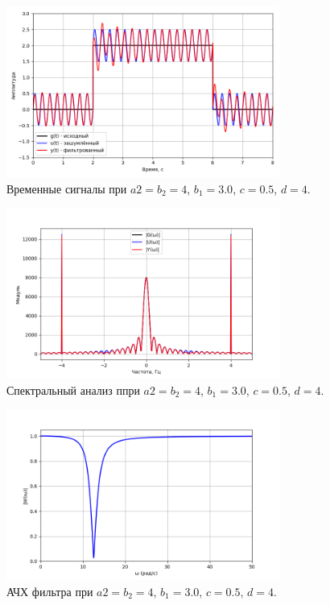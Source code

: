 \documentclass[a4paper]{article}
\begin{document}
\begin{figure}[H]
  \centering
  \includegraphics[width=0.8\textwidth]{src/task_1_2/1. time_157_3_0.5.png}
  \caption{Временные сигналы при $a2 = b_2 = 4$, $b_1=3.0$, $c=0.5$, $d=4$.}
\end{figure}
\begin{figure}[H]
  \centering
  \includegraphics[width=0.8\textwidth]{src/task_1_2/1. spec_157_3_0.5.png}
  \caption{Спектральный анализ ппри $a2 = b_2 = 4$, $b_1=3.0$, $c=0.5$, $d=4$.}
\end{figure}
\begin{figure}[H]
  \centering
  \includegraphics[width=0.8\textwidth]{src/task_1_2/1. ach_157_3_0.5.png}
  \caption{АЧХ фильтра при $a2 = b_2 = 4$, $b_1=3.0$, $c=0.5$, $d=4$.}
\end{figure}
\end{document}
